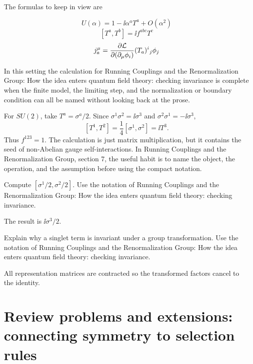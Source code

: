 The formulas to keep in view are

\[
  U(\alpha)=1-\ii\alpha^aT^a+O(\alpha^2)
\]
\[
  [T^a,T^b]=\ii f^{abc}T^c
\]
\[
  j^\mu_a=\frac{\partial\mathcal L}{\partial(\partial_\mu\phi_i)}(T_a)^i{}_j\phi_j
\]

In this setting the calculation for Running Couplings and the Renormalization Group: How the idea enters quantum field theory: checking invariance is complete when the finite model, the limiting step, and the normalization or boundary condition can all be named without looking back at the prose.




\begin{example}
For \(SU(2)\), take \(T^a=\sigma^a/2\).  Since \(\sigma^1\sigma^2=\ii\sigma^3\) and \(\sigma^2\sigma^1=-\ii\sigma^3\),
\[
  [T^1,T^2]=\frac14[\sigma^1,\sigma^2]=\ii T^3.
\]
Thus \(f^{123}=1\).  The calculation is just matrix multiplication, but it contains the seed of non-Abelian gauge self-interactions.  In Running Couplings and the Renormalization Group, section 7, the useful habit is to name the object, the operation, and the assumption before using the compact notation.
\end{example}



\begin{exercise}
Compute \([\sigma^1/2,\sigma^2/2]\).  Use the notation of Running Couplings and the Renormalization Group: How the idea enters quantum field theory: checking invariance.
\begin{answer}
The result is \(\ii\sigma^3/2\).
\end{answer}
\end{exercise}

\begin{exercise}
Explain why a singlet term is invariant under a group transformation.  Use the notation of Running Couplings and the Renormalization Group: How the idea enters quantum field theory: checking invariance.
\begin{answer}
All representation matrices are contracted so the transformed factors cancel to the identity.
\end{answer}
\end{exercise}



\section{Review problems and extensions: connecting symmetry to selection rules}

